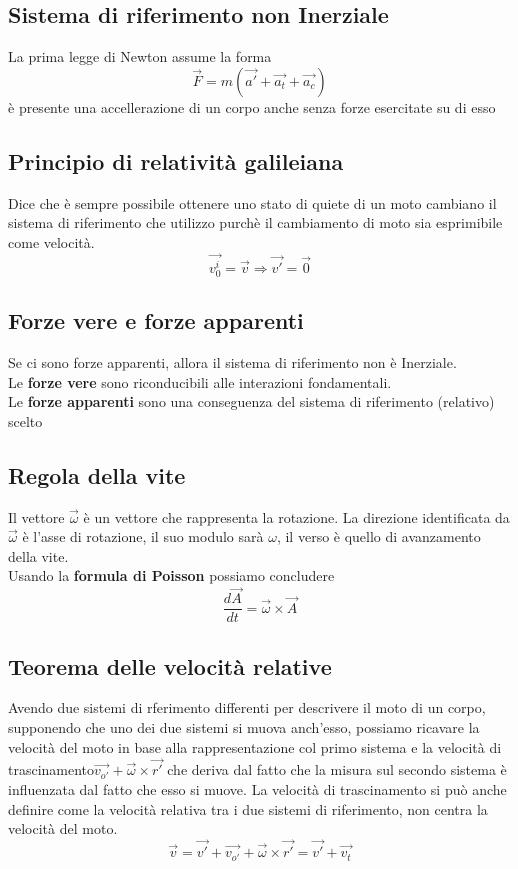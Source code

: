 \documentclass[a4paper]{report}
\begin{document}
  \subsection{Sistema di riferimento non Inerziale}
  La prima legge di Newton assume la forma
  $$ \vec{F} = m(\vec{a'} + \vec{a_t} + \vec{a_c}) $$
  è presente una accellerazione di un corpo anche senza forze esercitate su di esso
  \subsection{Principio di relatività galileiana}
  Dice che è sempre possibile ottenere uno stato di quiete di un moto cambiano il sistema di riferimento che utilizzo purchè il cambiamento di moto sia esprimibile come velocità.
  $$\vec{v_0^i} = \vec{v} \Rightarrow \vec{v'} = \vec{0}$$

  \subsection{Forze vere e forze apparenti}
  Se ci sono forze apparenti, allora il sistema di riferimento non è Inerziale. \\
  Le \textbf{forze vere} sono riconducibili alle interazioni fondamentali.\\
  Le \textbf{forze apparenti} sono una conseguenza del sistema di riferimento (relativo) scelto
  \subsection{Regola della vite}
  Il vettore $\vec{\omega}$ è un vettore che rappresenta la rotazione. La direzione identificata da $\vec{\omega}$ è l'asse di rotazione, il suo modulo sarà $\omega$, il verso è quello di avanzamento della vite.\\
  Usando la \textbf{formula di Poisson} possiamo concludere
  $$\frac{d\vec{A}}{dt} = \vec{\omega} \times \vec{A}$$
  \subsection{Teorema delle velocità relative}
  Avendo due sistemi di rferimento differenti per descrivere il moto di un corpo, supponendo che uno dei due sistemi si muova anch'esso, possiamo ricavare la velocità del moto in base alla rappresentazione col primo sistema e la velocità di trascinamento$ \vec{v_{o'}} + \vec{\omega} \times \vec{r'}$ che deriva dal fatto che la misura sul secondo sistema è influenzata dal fatto che esso si muove. La velocità di trascinamento si può anche definire come la velocità relativa tra i due sistemi di riferimento, non centra la velocità del moto.
  $$ \vec{v} = \vec{v'} + \vec{v_{o'}} + \vec{\omega} \times \vec{r'} = \vec{v'} + \vec{v_t}$$
\end{document}
